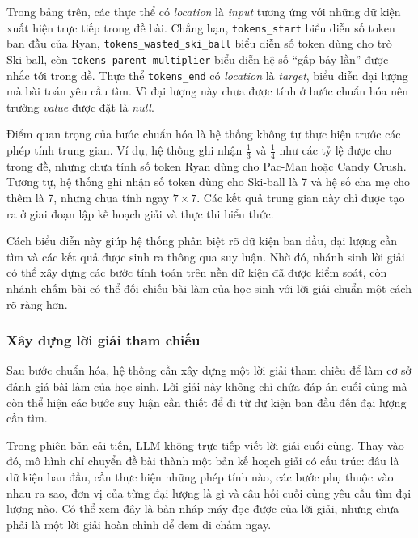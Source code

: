 \documentclass[12pt,a4paper]{article}
\begin{document}
Trong bảng trên, các thực thể có \textit{location} là \textit{input} tương ứng với những dữ kiện xuất hiện trực tiếp trong đề bài. Chẳng hạn, \texttt{tokens\_start} biểu diễn số token ban đầu của Ryan, \texttt{tokens\_wasted\_ski\_ball} biểu diễn số token dùng cho trò Ski-ball, còn \texttt{tokens\_parent\_multiplier} biểu diễn hệ số ``gấp bảy lần'' được nhắc tới trong đề. Thực thể \texttt{tokens\_end} có \textit{location} là \textit{target}, biểu diễn đại lượng mà bài toán yêu cầu tìm. Vì đại lượng này chưa được tính ở bước chuẩn hóa nên trường \textit{value} được đặt là \textit{null}.

Điểm quan trọng của bước chuẩn hóa là hệ thống không tự thực hiện trước các phép tính trung gian. Ví dụ, hệ thống ghi nhận $\frac{1}{3}$ và $\frac{1}{4}$ như các tỷ lệ được cho trong đề, nhưng chưa tính số token Ryan dùng cho Pac-Man hoặc Candy Crush. Tương tự, hệ thống ghi nhận số token dùng cho Ski-ball là 7 và hệ số cha mẹ cho thêm là 7, nhưng chưa tính ngay $7 \times 7$. Các kết quả trung gian này chỉ được tạo ra ở giai đoạn lập kế hoạch giải và thực thi biểu thức.

Cách biểu diễn này giúp hệ thống phân biệt rõ dữ kiện ban đầu, đại lượng cần tìm và các kết quả được sinh ra thông qua suy luận. Nhờ đó, nhánh sinh lời giải có thể xây dựng các bước tính toán trên nền dữ kiện đã được kiểm soát, còn nhánh chấm bài có thể đối chiếu bài làm của học sinh với lời giải chuẩn một cách rõ ràng hơn.





\subsubsection{Xây dựng lời giải tham chiếu}

Sau bước chuẩn hóa, hệ thống cần xây dựng một lời giải tham chiếu để làm cơ sở
đánh giá bài làm của học sinh. Lời giải này không chỉ chứa đáp án cuối cùng mà
còn thể hiện các bước suy luận cần thiết để đi từ dữ kiện ban đầu đến đại lượng
cần tìm.

Trong phiên bản cải tiến, LLM không trực tiếp viết lời giải cuối cùng. Thay vào
đó, mô hình chỉ chuyển đề bài thành một bản kế hoạch giải có cấu trúc: đâu là dữ
kiện ban đầu, cần thực hiện những phép tính nào, các bước phụ thuộc vào nhau ra
sao, đơn vị của từng đại lượng là gì và câu hỏi cuối cùng yêu cầu tìm đại lượng
nào. Có thể xem đây là bản nháp máy đọc được của lời giải, nhưng chưa phải là
một lời giải hoàn chỉnh để đem đi chấm ngay.
\end{document}
